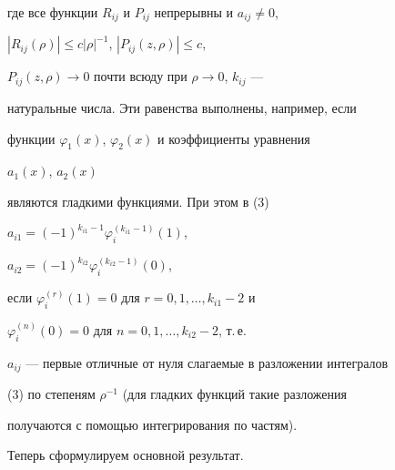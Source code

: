 где все функции $R_{ij}$ и $P_{ij}$ непрерывны и $a_{ij}\ne0$, 


$|R_{ij}(\rho)|\le c|\rho|^{-1}$, $|P_{ij}(z,\rho)|\le c$, 


$P_{ij}(z,\rho)\to 0$ почти всюду при $\rho\to 0$, $k_{ij}$ --- 


натуральные числа. Эти равенства выполнены, например, если  


функции $\varphi_1(x)$, $\varphi_2(x)$ и коэффициенты уравнения 


$a_1(x)$, $a_2(x)$ 


являются гладкими функциями. При этом в (3) 


$a_{i1}=(-1)^{k_{i1}-1}\varphi_i^{(k_{i1}-1)}(1)$, 


$a_{i2}=(-1)^{k_{i2}}\varphi_i^{(k_{i2}-1)}(0)$, 


если $\varphi^{(r)}_i(1)=0$ для $r=0,1,\dotsc,k_{i1}-2$ и 


$\varphi^{(n)}_i(0)=0$ для $n=0,1,\dotsc,k_{i2}-2$, т.\,е. 


$a_{ij}$ --- первые отличные от нуля слагаемые в разложении интегралов  


(3) по степеням $\rho^{-1}$ (для гладких функций такие разложения  


получаются с помощью интегрирования по частям). 


 


Теперь сформулируем основной результат.  


 


